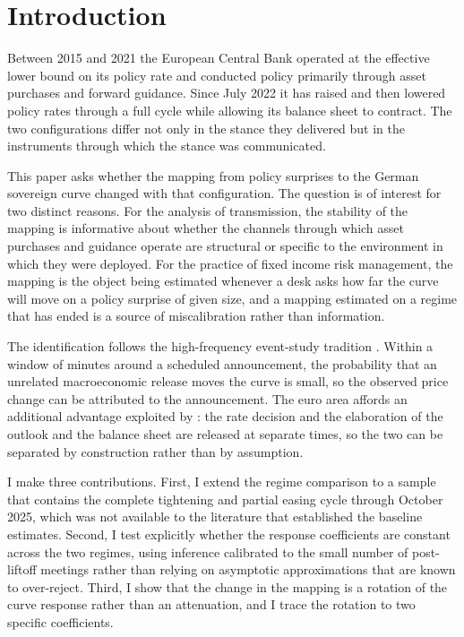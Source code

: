 \documentclass[11pt]{article}
\begin{document}
\newpage

\section{Introduction}

Between 2015 and 2021 the European Central Bank operated at the effective lower
bound on its policy rate and conducted policy primarily through asset purchases
and forward guidance. Since July 2022 it has raised and then lowered policy
rates through a full cycle while allowing its balance sheet to contract. The two
configurations differ not only in the stance they delivered but in the
instruments through which the stance was communicated.

This paper asks whether the mapping from policy surprises to the German
sovereign curve changed with that configuration. The question is of interest for
two distinct reasons. For the analysis of transmission, the stability of the
mapping is informative about whether the channels through which asset purchases
and guidance operate are structural or specific to the environment in which they
were deployed. For the practice of fixed income risk management, the mapping is
the object being estimated whenever a desk asks how far the curve will move on a
policy surprise of given size, and a mapping estimated on a regime that has ended
is a source of miscalibration rather than information.

The identification follows the high-frequency event-study tradition
\citep{kuttner2001,gurkaynak2005,altavilla2019}. Within a window of minutes
around a scheduled announcement, the probability that an unrelated macroeconomic
release moves the curve is small, so the observed price change can be attributed
to the announcement. The euro area affords an additional advantage exploited by
\citet{altavilla2019}: the rate decision and the elaboration of the outlook and
the balance sheet are released at separate times, so the two can be separated by
construction rather than by assumption.

I make three contributions. First, I extend the regime comparison to a sample
that contains the complete tightening and partial easing cycle through October
2025, which was not available to the literature that established the baseline
estimates. Second, I test explicitly whether the response coefficients are
constant across the two regimes, using inference calibrated to the small number
of post-liftoff meetings rather than relying on asymptotic approximations that
are known to over-reject. Third, I show that the change in the mapping is a
rotation of the curve response rather than an attenuation, and I trace the
rotation to two specific coefficients.
\end{document}
